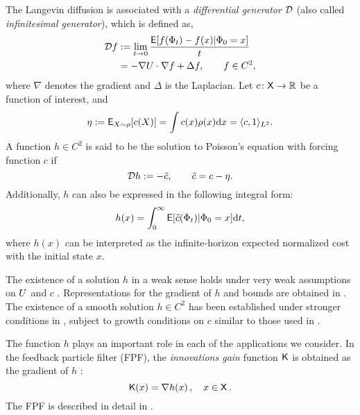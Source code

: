 
The Langevin diffusion is associated with a \textit{differential generator} ${\cal D}$ (also called \textit{infinitesimal generator}), which is defined as,
\begin{equation}
\begin{aligned}
\generate f &:= \lim_{t \to 0} \frac{\Expect [ f(\markovstate_t) - f(x) | \markovstate_0 = x]}{t} \\
& = -\nabla \pot \cdot \nabla f + \Delta f,\qquad f\in C^2,
\label{e:langevin_generator}
\end{aligned}
\end{equation}
where $\nabla$ denotes the gradient and $\Delta$ is the Laplacian. Let $c \colon {\sf X} \to \mathbb{R}$ be a function of interest, and 
\[
\eta := {\sf E}_{X \sim \rho}[c(X)] =  \int c(x) \rho(x) \text{d} x = \langle c, 1 \rangle_{L^2}.
\]
A function $h\in C^2$ is said to be the solution to Poisson's equation with forcing function $c$ if
\begin{equation}
\generate h := - \tilc, \qquad  \tilc = c - \eta.
\label{e:poissons}
\end{equation}
Additionally, $h$ can also be expressed in the following integral form:
\begin{equation}
h(x) =\int_0^\infty {\sf E}[\tilde c(\Phi_t)|\Phi_0 = x] \text{d} t,
\end{equation}
where $h(x)$ can be interpreted as the infinite-horizon expected normalized cost with the initial state $x$. 

The existence of a solution $h$ in a weak sense holds under very weak assumptions on $U$ and $c$  \cite{glymey96a,konmey12a}.   Representations for the gradient of $h$ and bounds are obtained in \cite{laumehmeyrag15,devkonmey17b}.   The existence of  a  smooth solution $h\in C^2$ has been established under stronger conditions in \cite{parver01}, subject to growth conditions on $c$ similar to those used in  \cite{glymey96a}. 

The function $h$ plays an important role in each of the applications we consider. In the feedback particle filter (FPF), the \textit{innovations gain} function $\text{\sf K}$ is obtained as  the gradient of $h$ \cite{yanmehmey13}:
\begin{equation}
\kFPF (x) = \nabla h(x)\, ,  \quad x\in\state\, .
\label{e:fpfgain}
\end{equation}
The FPF is described in detail in \Chapter{}.

